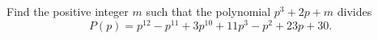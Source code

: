Find the positive integer $m$ such that the polynomial $p^3+2p+m$ divides
\[P(p)=p^{12}-p^{11}+3p^{10}+11p^3-p^2+23p+30 .\]

